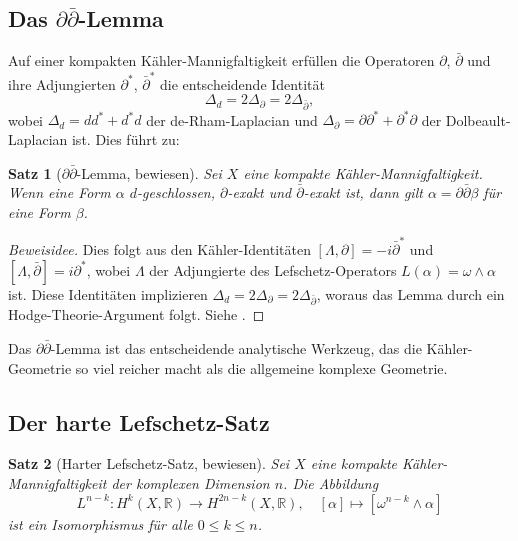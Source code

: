 \documentclass[12pt,a4paper]{amsart}
\newtheorem{theorem}{Satz}[section]
\theoremstyle{definition}
\theoremstyle{remark}
\begin{document}
\subsection{Das \texorpdfstring{$\partial\bar\partial$}{deldel-quer}-Lemma}

Auf einer kompakten Kähler-Mannigfaltigkeit erfüllen die Operatoren $\partial$,
$\bar\partial$ und ihre Adjungierten $\partial^*$, $\bar\partial^*$ die entscheidende
Identität
\[
  \Delta_d = 2\Delta_\partial = 2\Delta_{\bar\partial},
\]
wobei $\Delta_d = dd^* + d^*d$ der de-Rham-Laplacian und $\Delta_\partial =
\partial\partial^* + \partial^*\partial$ der Dolbeault-Laplacian ist. Dies führt zu:

\begin{theorem}[$\partial\bar\partial$-Lemma, bewiesen]
\label{thm:ddbar}
Sei $X$ eine kompakte Kähler-Mannigfaltigkeit. Wenn eine Form $\alpha$ $d$-geschlossen,
$\partial$-exakt und $\bar\partial$-exakt ist, dann gilt $\alpha = \partial\bar\partial\beta$
für eine Form $\beta$.
\end{theorem}

\begin{proof}[Beweisidee]
Dies folgt aus den Kähler-Identitäten $[\Lambda, \partial] = -i\bar\partial^*$ und
$[\Lambda, \bar\partial] = i\partial^*$, wobei $\Lambda$ der Adjungierte des
Lefschetz-Operators $L(\alpha) = \omega \wedge \alpha$ ist. Diese Identitäten implizieren
$\Delta_d = 2\Delta_\partial = 2\Delta_{\bar\partial}$, woraus das Lemma durch ein
Hodge-Theorie-Argument folgt. Siehe \cite[Kap.~6]{griffiths_harris1978}.
\end{proof}

Das $\partial\bar\partial$-Lemma ist das entscheidende analytische Werkzeug, das die
Kähler-Geometrie so viel reicher macht als die allgemeine komplexe Geometrie.

\subsection{Der harte Lefschetz-Satz}

\begin{theorem}[Harter Lefschetz-Satz, bewiesen]
\label{thm:hard-lefschetz}
Sei $X$ eine kompakte Kähler-Mannigfaltigkeit der komplexen Dimension $n$. Die Abbildung
\[
  L^{n-k} : H^k(X,\mathbb{R}) \longrightarrow H^{2n-k}(X,\mathbb{R}),
  \quad [\alpha] \mapsto [\omega^{n-k} \wedge \alpha]
\]
ist ein Isomorphismus für alle $0 \le k \le n$.
\end{theorem}
\end{document}
